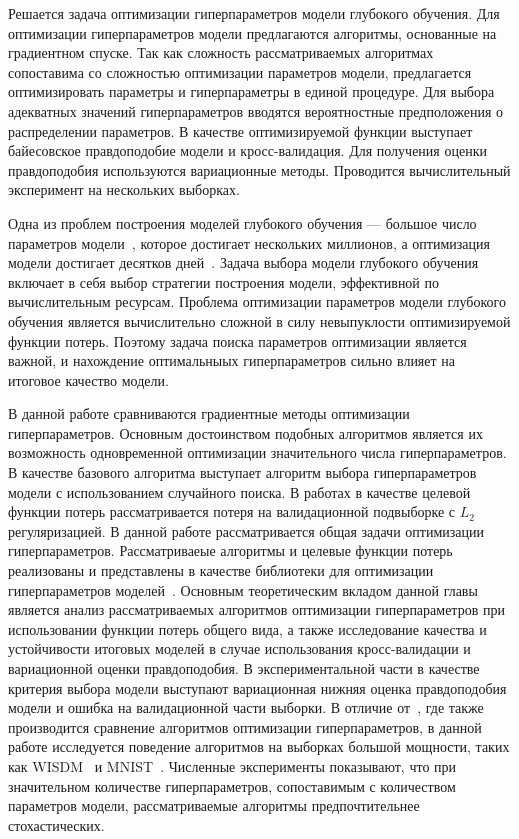Решается задача оптимизации гиперпараметров модели глубокого обучения. Для оптимизации гиперпараметров модели предлагаются алгоритмы, основанные на градиентном спуске. Так как сложность рассматриваемых алгоритмах сопоставима со сложностью оптимизации параметров модели, предлагается оптимизировать параметры и гиперпараметры в единой процедуре. Для выбора адекватных значений гиперпараметров вводятся вероятностные предположения о распределении параметров. В качестве оптимизируемой функции выступает байесовское правдоподобие модели и кросс-валидация. Для получения оценки правдоподобия используются вариационные методы. Проводится вычислительный эксперимент на нескольких выборках.

Одна из проблем построения моделей глубокого обучения --- большое число параметров модели~\cite{hinton_rbm}, которое достигает нескольких миллионов, а оптимизация модели достигает десятков дней~\cite{suts}. Задача выбора модели глубокого обучения включает в себя выбор стратегии построения модели, эффективной по вычислительным ресурсам. Проблема оптимизации параметров модели глубокого обучения является вычислительно сложной в силу невыпуклости оптимизируемой функции потерь. Поэтому задача поиска параметров оптимизации является важной, и нахождение оптимальныых гиперпараметров сильно влияет на итоговое качество модели. 

В данной работе сравниваются градиентные методы оптимизации гиперпараметров. Основным достоинством подобных алгоритмов является их возможность одновременной оптимизации значительного числа гиперпараметров. В качестве базового алгоритма выступает алгоритм выбора гиперпараметров модели с использованием случайного поиска.  В работах\cite{hyper_mad,hyper_hoag,greed_hyper} в качестве целевой функции потерь рассматривается потеря на валидационной подвыборке с $L_2$ регуляризацией. В данной работе рассматривается общая задачи оптимизации гиперпараметров. Рассматриваеые алгоритмы и целевые функции потерь реализованы и представлены в качестве библиотеки для оптимизации гиперпараметров моделей~\cite{pyfos}. Основным теоретическим вкладом данной главы является анализ рассматриваемых алгоритмов оптимизации гиперпараметров при использовании функции потерь общего вида, а также исследование качества и устойчивости итоговых моделей в случае использования кросс-валидации и вариационной оценки правдоподобия.  В экспериментальной части в качестве критерия выбора модели выступают вариационная нижняя оценка правдоподобия модели и ошибка на валидационной части выборки. В отличие от~\cite{hyper_hoag}, где также производится сравнение алгоритмов оптимизации гиперпараметров, в данной работе исследуется поведение алгоритмов на выборках большой мощности, таких как WISDM~\cite{wisdm} и MNIST~\cite{mnist}.
Численные эксперименты показывают, что при значительном количестве гиперпараметров, сопоставимым с количеством параметров модели, рассматриваемые алгоритмы предпочтительнее стохастических. 





